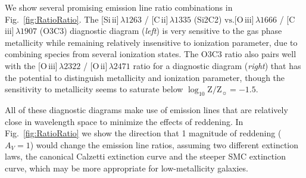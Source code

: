 \documentclass[preprint2,trackchanges]{aastex62}
\newcommand\vs{\ensuremath{\mathrm{vs.}}\xspace}
\newcommand{\logten}{\ensuremath{\log_{10}}}
\newcommand{\logZeq}[1]{\ensuremath{\logten \mathrm{Z}/\mathrm{Z}_{\sun} = #1}}
\begin{document}

We show several promising emission line ratio combinations in Fig.~\ref{fig:RatioRatio}. The [Si{\sc \,ii}]$\,\lambda1263$ / [C{\sc \,ii}]$\,\lambda1335$ (Si2C2) \vs [O{\sc \,iii}]$\,\lambda1666$ / [C{\sc \,iii}]$\,\lambda1907$ (O3C3) diagnostic diagram (\emph{left}) is very sensitive to the gas phase metallicity while remaining relatively insensitive to ionization parameter, due to combining species from several ionization states. The O3C3 ratio also pairs well with the [O{\sc \,iii}]$\,\lambda2322$ / [O{\sc \,ii}]$\,\lambda2471$ ratio for a diagnostic diagram (\emph{right}) that has the potential to distinguish metallicity and ionization parameter, though the sensitivity to metallicity seems to saturate below \logZeq{-1.5}.

All of these diagnostic diagrams make use of emission lines that are relatively close in wavelength space to minimize the effects of reddening. In Fig.~\ref{fig:RatioRatio} we show the direction that 1 magnitude of reddening ($A_V=1$) would change the emission line ratios, assuming two different extinction laws, the canonical Calzetti extinction curve and the steeper SMC extinction curve, which may be more appropriate for low-metallicity galaxies.
\end{document}
